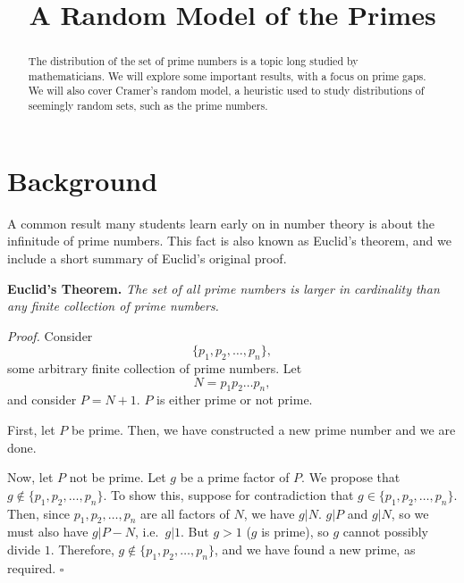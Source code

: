 \documentclass[conference]{IEEEtran}
\begin{document}
\title{A Random Model of the Primes}
\author{
\and
{}
\and
{}
}

\maketitle
\thispagestyle{plain}

\begin{abstract}
The distribution of the set of prime numbers is a topic long studied by mathematicians. We will explore some important results, with a focus on prime gaps. We will also cover Cramer's random model, a heuristic used to study distributions of seemingly random sets, such as the prime numbers. 
\end{abstract}

\section{Background}

A common result many students learn early on in number theory is about the
infinitude of prime numbers. This fact is also known as Euclid's theorem,
and we include a short summary of Euclid's original proof.

\medskip\noindent
\textbf{Euclid's Theorem.} \textit{The set of all prime numbers is larger
in cardinality than any finite collection of prime numbers. \cite{b8}}

\smallskip\noindent
\textit{Proof.} Consider \[\{p_1, p_2, \dots, p_n\},\] some arbitrary finite
collection of
prime numbers. Let \[N = p_1p_2 \dots p_n,\] and consider $P = N + 1$. $P$ is
either prime or not prime.

First, let $P$ be prime. Then, we have constructed a new prime number and
we are done.

Now, let $P$ not be prime. Let $g$ be a prime factor of $P$. We propose that
$g \notin \{p_1, p_2, \dots, p_n\}$. To show this, suppose for contradiction that
$g \in \{p_1, p_2, \dots, p_n\}$. Then, since $p_1, p_2, \dots, p_n$ are all
factors of $N$, we have $g | N$. $g | P$ and $g | N$, so
we must also have $g | P - N$, i.e.\ $g | 1$. But $g > 1$ ($g$ is prime),
so $g$ cannot possibly divide $1$. Therefore,
$g \notin \{p_1, p_2, \dots, p_n\}$, and we have found a new prime, as
required. \hfill$\square$\medskip
\end{document}
